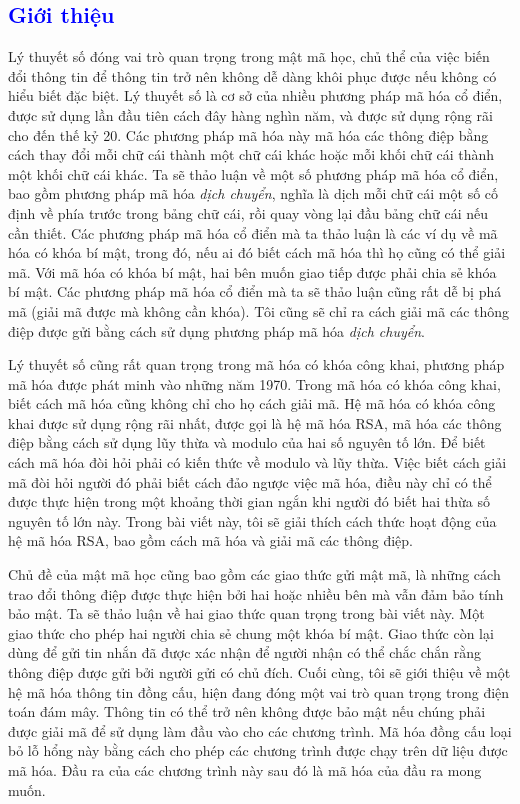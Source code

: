 \textcolor{blue}{\section{Giới thiệu}}
Lý thuyết số đóng vai trò quan trọng trong mật mã học, chủ thể của việc biến đổi thông tin để thông tin trở nên không dễ dàng khôi phục được nếu không có hiểu biết đặc biệt. Lý thuyết số là cơ sở của nhiều phương pháp mã hóa cổ điển, được sử dụng lần đầu tiên cách đây hàng nghìn năm, và được sử dụng rộng rãi cho đến thế kỷ 20. Các phương pháp mã hóa này mã hóa các thông điệp bằng cách thay đổi mỗi chữ cái thành một chữ cái khác hoặc mỗi khối chữ cái thành một khối chữ cái khác. Ta sẽ thảo luận về một số phương pháp mã hóa cổ điển, bao gồm phương pháp mã hóa \textit{dịch chuyển}, nghĩa là dịch mỗi chữ cái một số cố định về phía trước trong bảng chữ cái, rồi quay vòng lại đầu bảng chữ cái nếu cần thiết. Các phương pháp mã hóa cổ điển mà ta thảo luận là các ví dụ về mã hóa có khóa bí mật, trong đó, nếu ai đó biết cách mã hóa thì họ cũng có thể giải mã. Với mã hóa có khóa bí mật, hai bên muốn giao tiếp được phải chia sẻ khóa bí mật. Các phương pháp mã hóa cổ điển mà ta sẽ thảo luận cũng rất dễ bị phá mã (giải mã được mà không cần khóa). Tôi cũng sẽ chỉ ra cách giải mã các thông điệp được gửi bằng cách sử dụng phương pháp mã hóa \textit{dịch chuyển}.

Lý thuyết số cũng rất quan trọng trong mã hóa có khóa công khai, phương pháp mã hóa được phát minh vào những năm 1970. Trong mã hóa có khóa công khai, biết cách mã hóa cũng không chỉ cho họ cách giải mã. Hệ mã hóa có khóa công khai được sử dụng rộng rãi nhất, được gọi là hệ mã hóa RSA, mã hóa các thông điệp bằng cách sử dụng lũy thừa và modulo của hai số nguyên tố lớn. Để biết cách mã hóa đòi hỏi phải có kiến thức về modulo và lũy thừa. Việc biết cách giải mã đòi hỏi người đó phải biết cách đảo ngược việc mã hóa, điều này chỉ có thể được thực hiện trong một khoảng thời gian ngắn khi người đó biết hai thừa số nguyên tố lớn này. Trong bài viết này, tôi sẽ giải thích cách thức hoạt động của hệ mã hóa RSA, bao gồm cách mã hóa và giải mã các thông điệp.

Chủ đề của mật mã học cũng bao gồm các giao thức gửi mật mã, là những cách trao đổi thông điệp được thực hiện bởi hai hoặc nhiều bên mà vẫn đảm bảo tính bảo mật. Ta sẽ thảo luận về hai giao thức quan trọng trong bài viết này. Một giao thức cho phép hai người chia sẻ chung một khóa bí mật. Giao thức còn lại dùng để gửi tin nhắn đã được xác nhận để người nhận có thể chắc chắn rằng thông điệp được gửi bởi người gửi có chủ đích. Cuối cùng, tôi sẽ giới thiệu về một hệ mã hóa thông tin đồng cấu, hiện đang đóng một vai trò quan trọng trong điện toán đám mây. Thông tin có thể trở nên không được bảo mật nếu chúng phải được giải mã để sử dụng làm đầu vào cho các chương trình. Mã hóa đồng cấu loại bỏ lỗ hổng này bằng cách cho phép các chương trình được chạy trên dữ liệu được mã hóa. Đầu ra của các chương trình này sau đó là mã hóa của đầu ra mong muốn.
